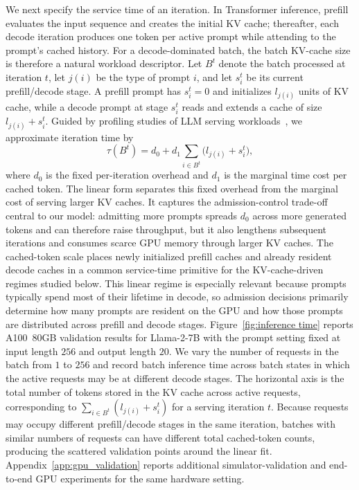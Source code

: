 We next specify the service time of an iteration. In Transformer inference, prefill evaluates the input sequence and creates the initial KV cache; thereafter, each decode iteration produces one token per active prompt while attending to the prompt's cached history. For a decode-dominated batch, the batch KV-cache size is therefore a natural workload descriptor. Let \(B^t\) denote the batch processed at iteration \(t\), let \(j(i)\) be the type of prompt \(i\), and let \(s_i^t\) be its current prefill/decode stage. A prefill prompt has \(s_i^t=0\) and initializes \(l_{j(i)}\) units of KV cache, while a decode prompt at stage \(s_i^t\) reads and extends a cache of size \(l_{j(i)}+s_i^t\). Guided by profiling studies of LLM serving workloads~\citep{agrawal2023sarathi,kwon2023efficient,zhong2024distserve}, we approximate iteration time by
\begin{equation}
\label{eq:time_consump}
    \tau(B^t) = d_0 + d_1 \sum_{i\in B^t} \bigl(l_{j(i)} + s_i^t\bigr),
\end{equation}
where \( d_0 \) is the fixed per-iteration overhead and \( d_1 \) is the marginal time cost per cached token. The linear form separates this fixed overhead from the marginal cost of serving larger KV caches. It captures the admission-control trade-off central to our model: admitting more prompts spreads \(d_0\) across more generated tokens and can therefore raise throughput, but it also lengthens subsequent iterations and consumes scarce GPU memory through larger KV caches. The cached-token scale places newly initialized prefill caches and already resident decode caches in a common service-time primitive for the KV-cache-driven regimes studied below. This linear regime is especially relevant because prompts typically spend most of their lifetime in decode, so admission decisions primarily determine how many prompts are resident on the GPU and how those prompts are distributed across prefill and decode stages. Figure~\ref{fig:inference time} reports A100~80GB validation results for Llama-2-7B with the prompt setting fixed at input length \(256\) and output length \(20\). We vary the number of requests in the batch from \(1\) to \(256\) and record batch inference time across batch states in which the active requests may be at different decode stages. The horizontal axis is the total number of tokens stored in the KV cache across active requests, corresponding to \(\sum_{i\in B^t}(l_{j(i)}+s_i^t)\) for a serving iteration \(t\). Because requests may occupy different prefill/decode stages in the same iteration, batches with similar numbers of requests can have different total cached-token counts, producing the scattered validation points around the linear fit. Appendix~\ref{app:gpu_validation} reports additional simulator-validation and end-to-end GPU experiments for the same hardware setting.

